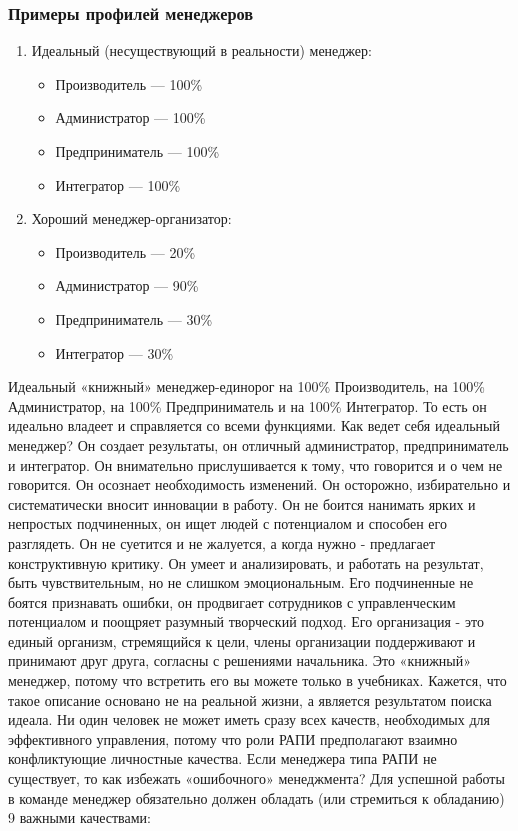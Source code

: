 \documentclass{../industrial-development}
\begin{document}
{\begin{frame} \frametitle{Примеры профилей менеджеров }
	\begin{enumerate}
\item Идеальный (несуществующий в реальности) менеджер: 
		 \begin{itemize}
                     \item Производитель — 100\%
 		 \item Администратор — 100\%
 		 \item Предприниматель — 100\%
		\item Интегратор — 100\%
		\end{itemize} 
\item Хороший менеджер-организатор:	
		 \begin{itemize}
                         \item Производитель — 20\%
 		 \item Администратор — 90\%
 		 \item Предприниматель — 30\%
		\item Интегратор — 30\%
		\end{itemize} 
\end{enumerate}
\end{frame}
\lecturenotes
Идеальный «книжный» менеджер-единорог на 100\% Производитель, на 100\% Администратор, на 100\% Предприниматель и на 100\% Интегратор. То есть он идеально владеет и справляется со всеми функциями.
Как ведет себя идеальный менеджер? Он создает результаты, он отличный администратор, предприниматель и интегратор. Он внимательно прислушивается к тому, что говорится и о чем не говорится. Он осознает необходимость изменений. Он осторожно, избирательно и систематически вносит инновации в работу. Он не боится нанимать ярких и непростых подчиненных, он ищет людей с потенциалом и способен его разглядеть. Он не суетится и не жалуется, а когда нужно - предлагает конструктивную критику. Он умеет и анализировать, и работать на результат, быть чувствительным, но не слишком эмоциональным. Его подчиненные не боятся признавать ошибки, он продвигает сотрудников с управленческим потенциалом и поощряет разумный творческий подход. Его организация - это единый организм, стремящийся к цели, члены организации поддерживают и принимают друг друга, согласны с решениями начальника.
Это «книжный» менеджер, потому что встретить его вы можете только в учебниках. Кажется, что такое описание основано не на реальной жизни, а является результатом поиска идеала. Ни один человек не может иметь сразу всех качеств, необходимых для эффективного управления, потому что роли РАПИ предполагают взаимно конфликтующие личностные качества.
Если менеджера типа РАПИ не существует, то как избежать «ошибочного» менеджмента? Для успешной работы в команде менеджер обязательно должен обладать (или стремиться к обладанию) 9  важными качествами:

}
\end{document}
